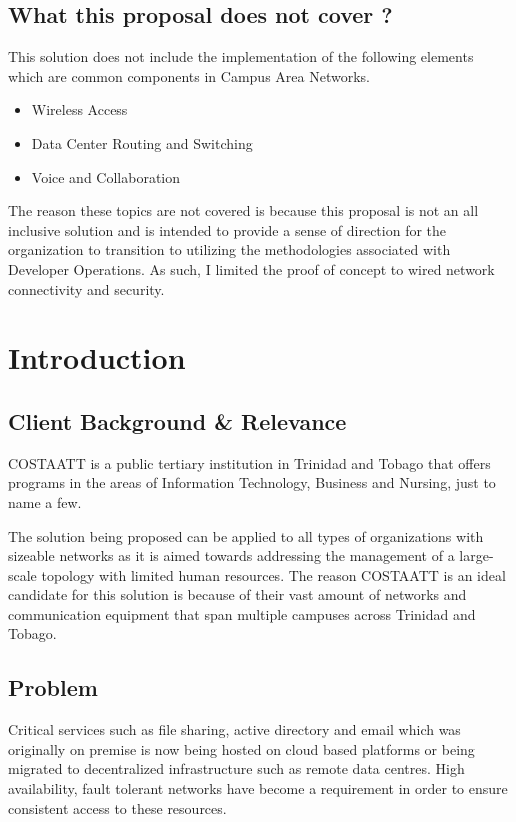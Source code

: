 \documentclass[12pt, letterpaper]{article}
\begin{document}
	\subsection{What this proposal does not cover ?}
This solution does not include the implementation of the following elements which are common components in Campus Area Networks.

\begin{itemize}
\item Wireless Access
\item Data Center Routing and Switching
\item Voice and Collaboration
\end{itemize}

The reason these topics are not covered is because this proposal is not an all inclusive solution and is intended to provide a sense of direction for the organization to transition to utilizing the methodologies associated with Developer Operations. As such, I limited the proof of concept to wired network connectivity and security. 

	
	
\newpage
\section{Introduction}

	\subsection{Client Background \& Relevance}
COSTAATT is a public tertiary institution in Trinidad and Tobago that offers programs in the areas of Information Technology, Business and Nursing, just to name a few.
	
\smallskip

The solution being proposed can be applied to all types of organizations with sizeable
networks as it is aimed towards addressing the management of a large-scale topology with limited human resources. The reason COSTAATT is an ideal candidate for this solution is because of their vast amount of networks and communication equipment that span multiple campuses across Trinidad and Tobago. 

	\subsection{Problem}
Critical services such as file sharing, active directory and email which was originally on premise is now being hosted on cloud based platforms or being migrated to decentralized infrastructure such as remote data centres. High availability, fault tolerant networks have become a requirement in order to ensure consistent access to these resources.
\end{document}
